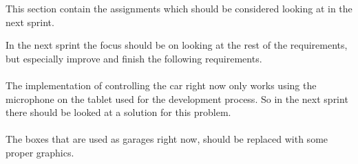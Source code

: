This section contain the assignments which should be considered looking at in the next sprint.

In the next sprint the focus should be on looking at the rest of the requirements, but especially improve and finish the following requirements.

\paragraph{}
The implementation of controlling the car right now only works using the microphone on the tablet used for the development process.
So in the next sprint there should be looked at a solution for this problem.
\paragraph{}
The boxes that are used as garages right now, should be replaced with some proper graphics.